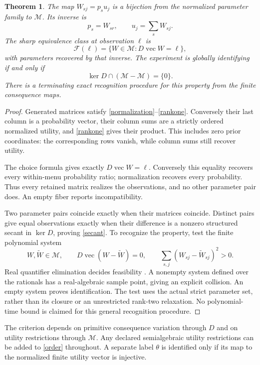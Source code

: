 \documentclass[11pt]{article}
\newtheorem{theorem}{Theorem}
\newcommand{\M}{\mathcal M}
\begin{document}
\begin{theorem}\label{identification}
The map $W_{sj}=p_su_j$ is a bijection from the normalized parameter family to $\M$. Its inverse is
\[
 p_s=W_{sr},\qquad u_j=\sum_sW_{sj}.
\]
The sharp equivalence class at observation $\ell$ is
\begin{equation}\label{fiber}
 \mathcal F(\ell)=\{W\in\M:D\operatorname{vec}W=\ell\},
\end{equation}
with parameters recovered by that inverse. The experiment is globally identifying if and only if
\begin{equation}\label{secant}
 \ker D\cap(\M-\M)=\{0\}.
\end{equation}
There is a terminating exact recognition procedure for this property from the finite consequence maps.
\end{theorem}
\begin{proof}
Generated matrices satisfy \eqref{normalization}--\eqref{rankone}. Conversely their last column is a probability vector, their column sums are a strictly ordered normalized utility, and \eqref{rankone} gives their product. This includes zero prior coordinates: the corresponding rows vanish, while column sums still recover utility.

The choice formula gives exactly $D\operatorname{vec}W=\ell$. Conversely this equality recovers every within-menu probability ratio; normalization recovers every probability. Thus every retained matrix realizes the observations, and no other parameter pair does. An empty fiber reports incompatibility.

Two parameter pairs coincide exactly when their matrices coincide. Distinct pairs give equal observations exactly when their difference is a nonzero structured secant in $\ker D$, proving \eqref{secant}. To recognize the property, test the finite polynomial system
\[
 W,\widetilde W\in\M,\qquad
 D\operatorname{vec}(W-\widetilde W)=0,\qquad
 \sum_{s,j}(W_{sj}-\widetilde W_{sj})^2>0.
\]
Real quantifier elimination decides feasibility \cite[Sections 13.1, 14.2]{BPR}. A nonempty system defined over the rationals has a real-algebraic sample point, giving an explicit collision. An empty system proves identification. The test uses the actual strict parameter set, rather than its closure or an unrestricted rank-two relaxation. No polynomial-time bound is claimed for this general recognition procedure.
\end{proof}

The criterion depends on primitive consequence variation through $D$ and on utility restrictions through $\M$. Any declared semialgebraic utility restrictions can be added to \eqref{order} throughout. A separate label $\theta$ is identified only if its map to the normalized finite utility vector is injective.
\end{document}
